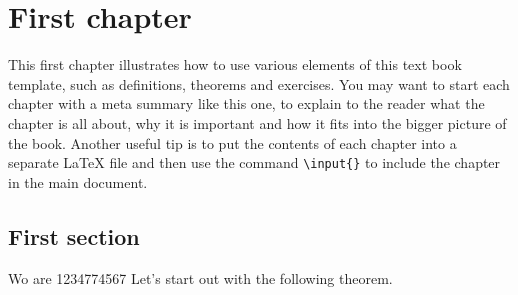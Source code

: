 \documentclass[11pt]{linearbook}
\begin{document}
\chapter{First chapter}

\begin{summary}
  This first chapter illustrates how to use various elements of this
  text book template, such as definitions, theorems and exercises. You
  may want to start each chapter with a meta summary like this one, to
  explain to the reader what the chapter is all about, why it is
  important and how it fits into the bigger picture of the
  book. Another useful tip is to put the contents of each chapter into
  a separate \LaTeX{} file and then use the command
  \texttt{\textbackslash{}input\{\}} to include the chapter in the
  main document.
\end{summary}

\section{First section}

{\ppl Wo are 12347}74567 {}
Let's start out with the following theorem.
\end{document}
